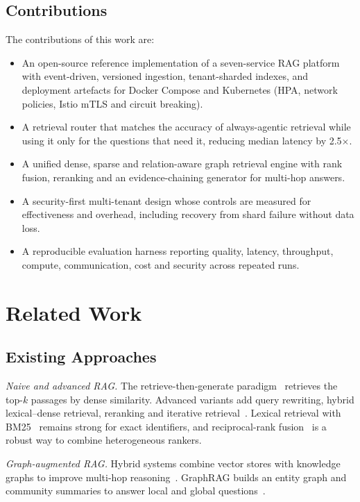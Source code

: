\documentclass[journal]{IEEEtran}
\begin{document}
\subsection{Contributions}
The contributions of this work are:
\begin{itemize}
    \item An open-source reference implementation of a seven-service RAG platform with event-driven,
          versioned ingestion, tenant-sharded indexes, and deployment artefacts for Docker Compose and
          Kubernetes (HPA, network policies, Istio mTLS and circuit breaking).
    \item A retrieval router that matches the accuracy of always-agentic retrieval while using it only for
          the questions that need it, reducing median latency by 2.5$\times$.
    \item A unified dense, sparse and relation-aware graph retrieval engine with rank fusion, reranking and
          an evidence-chaining generator for multi-hop answers.
    \item A security-first multi-tenant design whose controls are measured for effectiveness and overhead,
          including recovery from shard failure without data loss.
    \item A reproducible evaluation harness reporting quality, latency, throughput, compute, communication,
          cost and security across repeated runs.
\end{itemize}

\section{Related Work}

\subsection{Existing Approaches}
\textit{Naive and advanced RAG.} The retrieve-then-generate paradigm~\cite{lewis2020rag} retrieves the
top-$k$ passages by dense similarity. Advanced variants add query rewriting, hybrid lexical--dense
retrieval, reranking and iterative retrieval~\cite{fan2024survey}. Lexical retrieval with
BM25~\cite{robertson2009bm25} remains strong for exact identifiers, and reciprocal-rank
fusion~\cite{cormack2009rrf} is a robust way to combine heterogeneous rankers.

\textit{Graph-augmented RAG.} Hybrid systems combine vector stores with knowledge graphs to improve
multi-hop reasoning~\cite{barron2024domain}. GraphRAG builds an entity graph and community summaries to
answer local and global questions~\cite{edge2024graphrag}.
\end{document}

